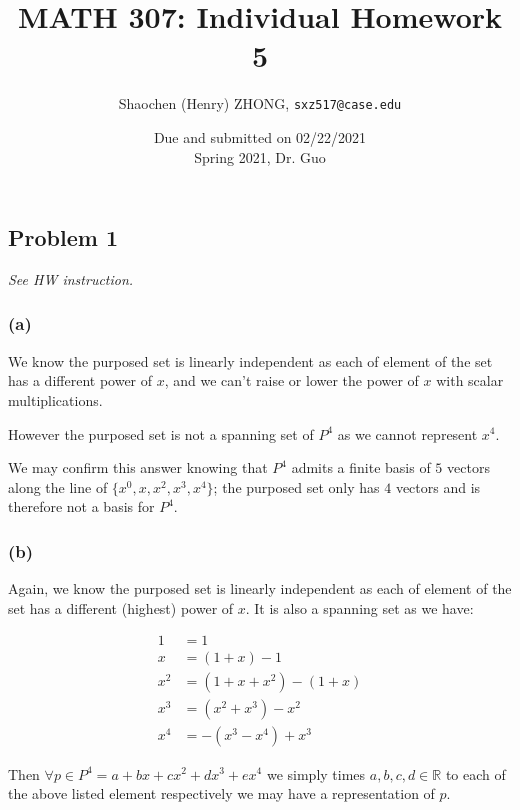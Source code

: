 \documentclass[11pt]{article}
\newcommand{\ilc}{\texttt}
\begin{document}
\title{\textbf{MATH 307: Individual Homework 5}}


\author{Shaochen (Henry) ZHONG, \ilc{sxz517@case.edu}}

\date{Due and submitted on 02/22/2021 \\ Spring 2021, Dr. Guo}
\maketitle

\subsection*{Problem 1}
\textit{See HW instruction.}\newline

\subsubsection*{(a)}

We know the purposed set is linearly independent as each of element of the set has a different power of $x$, and we can't raise or lower the power of $x$ with scalar multiplications.

However the purposed set is not a spanning set of $P^4$ as we cannot represent $x^4$.

We may confirm this answer knowing that $P^4$ admits a finite basis of $5$ vectors along the line of $\{x^0, x, x^2, x^3, x^4 \}$; the purposed set only has $4$ vectors and is therefore not a basis for $P^4$.

\subsubsection*{(b)}

Again, we know the purposed set is linearly independent as each of element of the set has a different (highest) power of $x$. It is also a spanning set as we have:

\begin{align*}
    1 &= 1 \\
    x &= (1 + x) - 1 \\
    x^2 &= (1 + x + x^2) -  (1 + x) \\
    x^3 &= (x^2 + x^3) - x^2 \\
    x^4 &= -(x^3 - x^4) + x^3
\end{align*}

Then $\forall p \in P^4 = a + bx + cx^2 + dx^3 + ex^4$ we simply times $a, b, c, d \in \mathbb{R}$ to each of the above listed element respectively we may have a representation of $p$.
\end{document}
